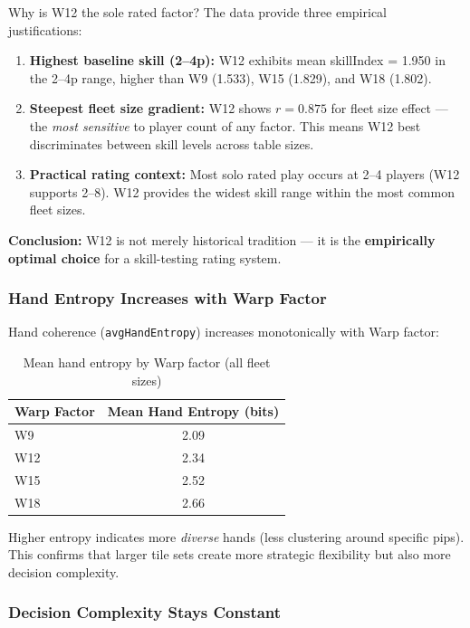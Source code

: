 \documentclass[11pt,letterpaper]{article}
\begin{document}
Why is W12 the sole rated factor? The data provide three empirical justifications:

\begin{enumerate}
\item \textbf{Highest baseline skill (2--4p):} W12 exhibits mean skillIndex = 1.950 in the 2--4p range, higher than W9 (1.533), W15 (1.829), and W18 (1.802).
\item \textbf{Steepest fleet size gradient:} W12 shows $r = 0.875$ for fleet size effect --- the \textit{most sensitive} to player count of any factor. This means W12 best discriminates between skill levels across table sizes.
\item \textbf{Practical rating context:} Most solo rated play occurs at 2--4 players (W12 supports 2--8). W12 provides the widest skill range within the most common fleet sizes.
\end{enumerate}

\textbf{Conclusion:} W12 is not merely historical tradition --- it is the \textbf{empirically optimal choice} for a skill-testing rating system.

\subsubsection{Hand Entropy Increases with Warp Factor}

Hand coherence (\texttt{avgHandEntropy}) increases monotonically with Warp factor:

\begin{table}[h]
\centering
\begin{tabular}{@{}lc@{}}
\toprule
\textbf{Warp Factor} & \textbf{Mean Hand Entropy (bits)} \\
\midrule
W9 & 2.09 \\
W12 & 2.34 \\
W15 & 2.52 \\
W18 & 2.66 \\
\bottomrule
\end{tabular}
\caption{Mean hand entropy by Warp factor (all fleet sizes)}
\end{table}

Higher entropy indicates more \textit{diverse} hands (less clustering around specific pips). This confirms that larger tile sets create more strategic flexibility but also more decision complexity.

\subsubsection{Decision Complexity Stays Constant}
\end{document}
